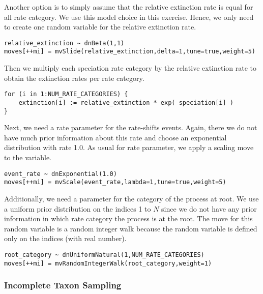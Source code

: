 Another option is to simply assume that the relative extinction rate is equal for all rate category.
We use this model choice in this exercise.
Hence, we only need to create one random variable for the relative extinction rate.
{\tt \begin{snugshade*}
\begin{lstlisting}
relative_extinction ~ dnBeta(1,1)
moves[++mi] = mvSlide(relative_extinction,delta=1,tune=true,weight=5)
\end{lstlisting}
\end{snugshade*}}
Then we multiply each speciation rate category by the relative extinction rate to obtain the extinction rates per rate category.
{\tt \begin{snugshade*}
\begin{lstlisting}
for (i in 1:NUM_RATE_CATEGORIES) {
    extinction[i] := relative_extinction * exp( speciation[i] )
}
\end{lstlisting}
\end{snugshade*}}

Next, we need a rate parameter for the rate-shifts events.
Again, there we do not have much prior information about this rate and choose an exponential distribution with rate 1.0.
As usual for rate parameter, we apply a scaling move to the  variable.
{\tt \begin{snugshade*}
\begin{lstlisting}
event_rate ~ dnExponential(1.0)
moves[++mi] = mvScale(event_rate,lambda=1,tune=true,weight=5)
\end{lstlisting}
\end{snugshade*}}

Additionally, we need a parameter for the category of the process at root.
We use a uniform prior distribution on the indices 1 to $N$ since we do not have any prior information in which rate category the process is at the root.
The move for this random variable is a random integer walk because the random variable is defined only on the indices (\CF with real number).
{\tt \begin{snugshade*}
\begin{lstlisting}
root_category ~ dnUniformNatural(1,NUM_RATE_CATEGORIES)
moves[++mi] = mvRandomIntegerWalk(root_category,weight=1)
\end{lstlisting}
\end{snugshade*}}



\subsubsection{Incomplete Taxon Sampling}

